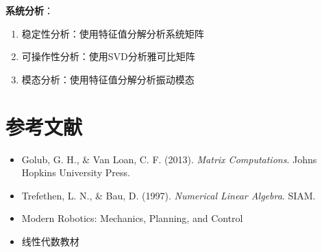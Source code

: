 \documentclass[12pt,a4paper]{article}
\begin{document}
\textbf{系统分析}：
\begin{enumerate}
\item 稳定性分析：使用特征值分解分析系统矩阵
\item 可操作性分析：使用SVD分析雅可比矩阵
\item 模态分析：使用特征值分解分析振动模态
\end{enumerate}

\section{参考文献}

\begin{itemize}
\item Golub, G. H., \& Van Loan, C. F. (2013). \textit{Matrix Computations}. Johns Hopkins University Press.
\item Trefethen, L. N., \& Bau, D. (1997). \textit{Numerical Linear Algebra}. SIAM.
\item Modern Robotics: Mechanics, Planning, and Control
\item 线性代数教材
\end{itemize}
\end{document}
